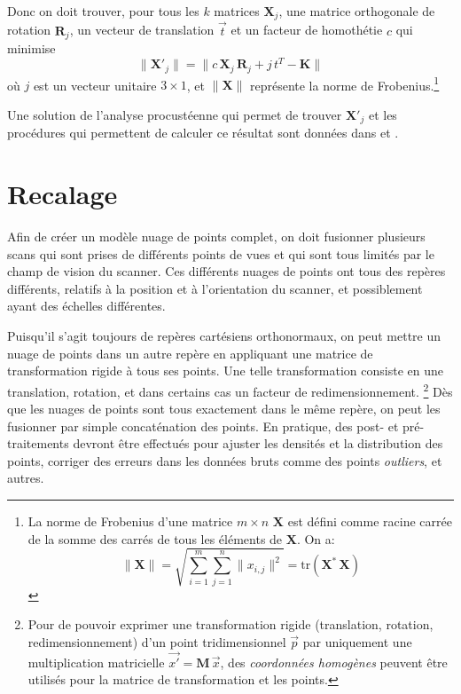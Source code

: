 \documentclass[a4paper,10pt]{scrreprt}
\begin{document}
Donc on doit trouver, pour tous les $k$ matrices $\mathbf{X}_j$, une matrice orthogonale de rotation $\mathbf{R}_j$, un vecteur de translation $\vec{t}$ et un facteur de homothétie $c$ qui minimise
\begin{equation*}
	\| \mathbf{X'}_j \| = \| c \, \mathbf{X}_j \, \mathbf{R}_j + j \, t^T - \mathbf{K} \|
\end{equation*}
où $j$ est un vecteur unitaire $3 \times 1$, et $\|\mathbf{X}\|$ représente la norme de Frobenius.\footnote{La norme de Frobenius d'une matrice $m \times n$ $\mathbf{X}$ est défini comme racine carrée de la somme des carrés de tous les éléments de $\mathbf{X}$. On a:
\begin{equation*}
	\| \mathbf{X} \|
	= \sqrt{ \sum_{i=1}^{m} \sum_{j=1}^{n} \| x_{i,j} \|^2 }
	= \text{tr}(\mathbf{X}^* \, \mathbf{X})
\end{equation*}}

Une solution de l'analyse procustéenne qui permet de trouver $\mathbf{X'}_j$ et les procédures qui permettent de calculer ce résultat sont données dans \cite{Scho1970} et \cite{Scho1966}. 


\section{Recalage}
Afin de créer un modèle nuage de points complet, on doit fusionner plusieurs scans qui sont prises de différents points de vues et qui sont tous limités par le champ de vision du scanner. Ces différents nuages de points ont tous des repères différents, relatifs à la position et à l'orientation du scanner, et possiblement ayant des échelles différentes.

Puisqu'il s'agit toujours de repères cartésiens orthonormaux, on peut mettre un nuage de points dans un autre repère en appliquant une matrice de transformation rigide à tous ses points. Une telle transformation consiste en une translation, rotation, et dans certains cas un facteur de redimensionnement.
\footnote{Pour de pouvoir exprimer une transformation rigide (translation, rotation, redimensionnement) d'un point tridimensionnel $\vec{p}$ par uniquement une multiplication matricielle $\vec{x'} = \mathbf{M} \, \vec{x}$, des \emph{coordonnées homogènes} peuvent être utilisés pour la matrice de transformation et les points.}
Dès que les nuages de points sont tous exactement dans le même repère, on peut les fusionner par simple concaténation des points. En pratique, des post- et pré-traitements devront être effectués pour ajuster les densités et la distribution des points, corriger des erreurs dans les données bruts comme des points \emph{outliers}, et autres.
\end{document}
